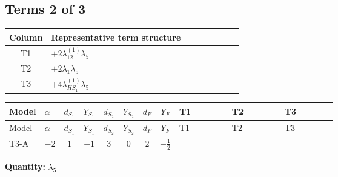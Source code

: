 \documentclass[8pt]{article}
\begin{document}
\begin{landscape}
\subsection*{Terms 2 of 3}
\begin{center}
\begin{tabular}{@{}c >{\raggedright\arraybackslash}p{0.82\linewidth}@{}}
\toprule
Column & Representative term structure \\
\midrule
T1 & \(\displaystyle +2 {\lambda_{12}^{(1)}} {\lambda_5}\) \\
\midrule
T2 & \(\displaystyle +2 {\lambda_1} {\lambda_5}\) \\
\midrule
T3 & \(\displaystyle +4 {\lambda_{HS_1}^{(1)}} {\lambda_5}\) \\
\midrule
\bottomrule
\end{tabular}
\end{center}
\smallskip
\tiny
\begin{longtable}{@{}llcccccc >{\raggedright\arraybackslash}p{0.21\linewidth} >{\raggedright\arraybackslash}p{0.21\linewidth} >{\raggedright\arraybackslash}p{0.21\linewidth}@{}}
\toprule
Model & $\alpha$ & $d_{S_1}$ & $Y_{S_1}$ & $d_{S_2}$ & $Y_{S_2}$ & $d_F$ & $Y_F$ & T1 & T2 & T3 \\
\midrule
\endfirsthead
\toprule
Model & $\alpha$ & $d_{S_1}$ & $Y_{S_1}$ & $d_{S_2}$ & $Y_{S_2}$ & $d_F$ & $Y_F$ & T1 & T2 & T3 \\
\midrule
\endhead
T3-A & $-2$ & $1$ & $-1$ & $3$ & $0$ & $2$ & $-\frac{1}{2}$ & \scriptsize\adjustbox{max width=\linewidth}{$\begin{gathered} +2 {\lambda_{12}^{(1)}} {\lambda_5}\end{gathered}$} & \scriptsize\adjustbox{max width=\linewidth}{$\begin{gathered} +2 {\lambda_1} {\lambda_5}\end{gathered}$} & \scriptsize\adjustbox{max width=\linewidth}{$\begin{gathered} +4 {\lambda_{HS_1}^{(1)}} {\lambda_5}\end{gathered}$} \\
\midrule
\bottomrule
\end{longtable}
\clearpage
\noindent\textbf{Quantity: }$\lambda_5$\par\smallskip

\end{landscape}
\end{document}
